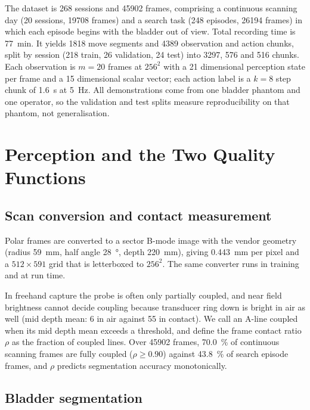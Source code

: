 \documentclass[conference]{IEEEtran}
\begin{document}
The dataset is 268 sessions and \num{45902} frames, comprising a continuous
scanning day (20 sessions, \num{19708} frames) and a search task (248 episodes,
\num{26194} frames) in which each episode begins with the bladder out of view.
Total recording time is \SI{77}{\minute}. It yields \num{1818} move segments
and \num{4389} observation and action chunks, split by session (218 train, 26
validation, 24 test) into \num{3297}, \num{576} and \num{516} chunks.
Each observation is $m = 20$ frames at $256^2$ with a 21 dimensional perception
state per frame and a 15 dimensional scalar vector; each action label is a
$k = 8$ step chunk of \SI{1.6}{\second} at \SI{5}{\hertz}. All demonstrations
come from one bladder phantom and one operator, so the validation and test
splits measure reproducibility on that phantom, not generalisation.


\section{Perception and the Two Quality Functions}
\label{sec:percep}

\subsection{Scan conversion and contact measurement}

Polar frames are converted to a sector B-mode image with the vendor geometry
(radius \SI{59}{\milli\metre}, half angle \SI{28}{\degree}, depth
\SI{220}{\milli\metre}), giving \SI{0.443}{\milli\metre} per pixel and a
$512 \times 591$ grid that is letterboxed to $256^2$. The same converter runs in
training and at run time.

In freehand capture the probe is often only partially coupled, and near field
brightness cannot decide coupling because transducer ring down is bright in air
as well (mid depth mean: 6 in air against 55 in contact). We call an A-line
coupled when its mid depth mean exceeds a threshold, and define the frame
contact ratio $\rho$ as the fraction of coupled lines. Over \num{45902} frames,
\SI{70.0}{\percent} of continuous scanning frames are fully coupled
($\rho \ge \num{0.90}$) against \SI{43.8}{\percent} of search episode frames, and
$\rho$ predicts segmentation accuracy monotonically.

\subsection{Bladder segmentation}
\end{document}
